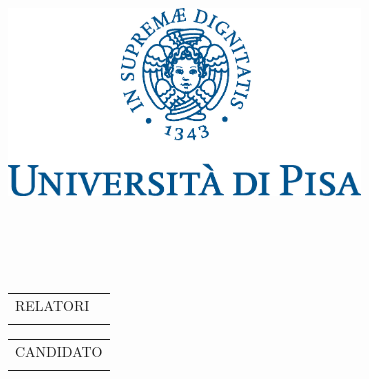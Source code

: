 \begin{titlepage}
	\begin{center}
		\includegraphics[width=0.7\textwidth]{img/marchio_unipi_pant541}\\
		\vspace{0.15cm}
		\Large
		\printdepartment\\
		\vspace{0.7cm}
		\large
		\printcoursename\\
		\normalsize
		\vspace{2.5cm}
		\textit{\printworktype}\\
		\vspace{0.5cm}
		\large
		\textbf{\printtitle}\\
		\normalsize
		\vfill%
		\begin{minipage}[t]{0.7\textwidth}
			\begin{tabular}[t]{ll}%
				RELATORI&\vspace{0.2cm}\\
				\printsupervisor
			\end{tabular}\par%
		\end{minipage}
		\hfill
		\begin{minipage}[t]{0.28\textwidth}\raggedleft
			\begin{tabular}[t]{c}%
				CANDIDATO\vspace{0.2cm}\\
				\printauthor
			\end{tabular}\par%
		\end{minipage}
		\vfill
		\large
		\printacademicyear
		\normalsize
	\end{center}
\end{titlepage}
